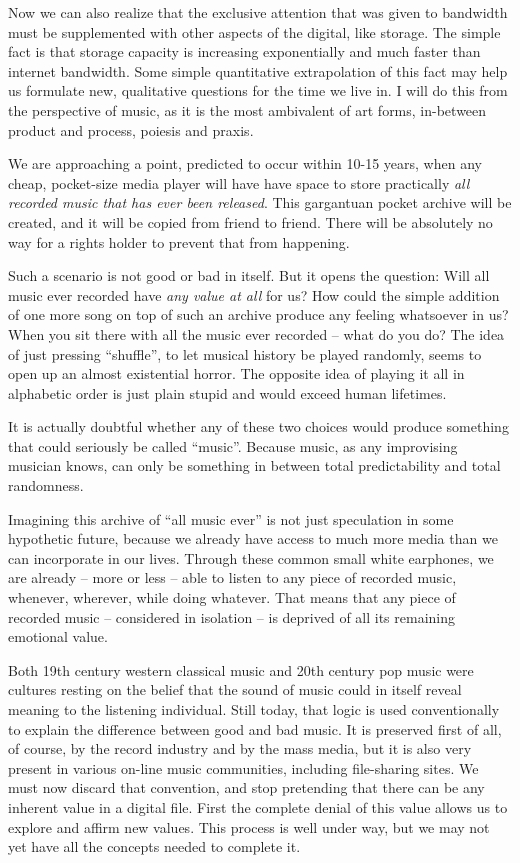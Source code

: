 Now we can also realize that the exclusive attention that was given to bandwidth
must be supplemented with other aspects of the digital, like storage. The simple
fact is that storage capacity is increasing exponentially and much faster than
internet bandwidth. Some simple quantitative extrapolation of this fact may help
us formulate new, qualitative questions for the time we live in. I will do this
from the perspective of music, as it is the most ambivalent of art forms,
in-between product and process, poiesis and praxis.

We are approaching a point, predicted to occur within 10-15 years, when any
cheap, pocket-size media player will have have space to store practically
\textit{all recorded music that has ever been released}. This gargantuan pocket
archive will be created, and it will be copied from friend to friend. There will
be absolutely no way for a rights holder to prevent that from happening.

Such a scenario is not good or bad in itself. But it opens the question: Will
all music ever recorded have \textit{any value at all} for us? How could the
simple addition of one more song on top of such an archive produce any feeling
whatsoever in us? When you sit there with all the music ever recorded – what do
you do? The idea of just pressing ``shuf\hbox{}f\hbox{}le'', to let musical
history be played randomly, seems to open up an almost existential horror. The
opposite idea of playing it all in alphabetic order is just plain stupid and
would exceed human lifetimes.

It is actually doubtful whether any of these two choices would produce something
that could seriously be called ``music''. Because music, as any improvising
musician knows, can only be something in between total predictability and total
randomness.

Imagining this archive of ``all music ever'' is not just speculation in some
hypothetic future, because we already have access to much more media than we can
incorporate in our lives. Through these common small white earphones, we are
already – more or less – able to listen to any piece of recorded music,
whenever, wherever, while doing whatever. That means that any piece of recorded
music – considered in isolation – is deprived of all its remaining emotional
value.

Both 19th century western classical music and 20th century pop music were
cultures resting on the belief that the sound of music could in itself reveal
meaning to the listening individual. Still today, that logic is used
conventionally to explain the dif\hbox{}ference between good and bad music. It
is preserved f\hbox{}irst of all, of course, by the record industry and by the
mass media, but it is also very present in various on-line music communities,
including f\hbox{}ile-sharing sites. We must now discard that convention, and
stop pretending that there can be any inherent value in a digital f\hbox{}ile.
F\hbox{}irst the complete denial of this value allows us to explore and
af\hbox{}f\hbox{}irm new values. This process is well under way, but we may not
yet have all the concepts needed to complete it.

